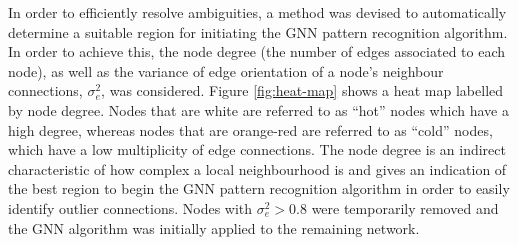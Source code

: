 In order to efficiently resolve ambiguities, a method was devised to automatically determine a suitable region for initiating the GNN pattern recognition algorithm. In order to achieve this, the node degree (the number of edges associated to each node), as well as the variance of edge orientation of a node's neighbour connections, $\sigma_e^2$, was considered. Figure \ref{fig:heat-map} shows a heat map labelled by node degree. Nodes that are white are referred to as ``hot'' nodes which have a high degree, whereas nodes that are orange-red are referred to as ``cold'' nodes, which have a low multiplicity of edge connections. The node degree is an indirect characteristic of how complex a local neighbourhood is and gives an indication of the best region to begin the GNN pattern recognition algorithm in order to easily identify outlier connections. Nodes with $\sigma_e^2 > 0.8$ were temporarily removed and the GNN algorithm was initially applied to the remaining network.

